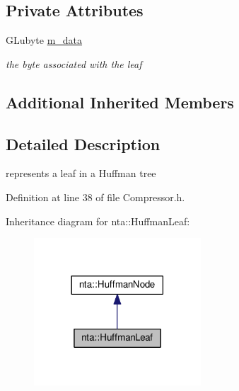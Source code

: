 \subsection*{Private Attributes}
\begin{DoxyCompactItemize}
\item 
\mbox{\label{classnta_1_1HuffmanLeaf_a1a02d12c1ee80e4d3686fb05a0d140b0}} 
G\+Lubyte \hyperlink{classnta_1_1HuffmanLeaf_a1a02d12c1ee80e4d3686fb05a0d140b0}{m\+\_\+data}
\begin{DoxyCompactList}\small\item\em the byte associated with the leaf \end{DoxyCompactList}\end{DoxyCompactItemize}
\subsection*{Additional Inherited Members}


\subsection{Detailed Description}
represents a leaf in a Huffman tree 

Definition at line 38 of file Compressor.\+h.



Inheritance diagram for nta\+:\+:Huffman\+Leaf\+:\nopagebreak
\begin{figure}[H]
\begin{center}
\leavevmode
\includegraphics[width=177pt]{df/d39/classnta_1_1HuffmanLeaf__inherit__graph}
\end{center}
\end{figure}


